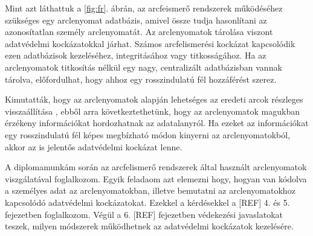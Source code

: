 
Mint azt láthattuk a \ref{fig:fr}. ábrán, az arcfeismerő rendszerek működéséhez szükséges egy arclenyomat adatbázis, amivel össze tudja hasonlítani az azonosítatlan személy arclenyomatát. Az arclenyomatok tárolása viszont adatvédelmi kockázatokkal járhat. Számos arcfelismerési kockázat kapcsolódik ezen adatbázisok kezeléséhez, integritásához vagy titkosságához. Ha az arclenyomatok titkosítás nélkül egy nagy, centralizált adatbázisban vannak tárolva, előfordulhat, hogy ahhoz egy rosszindulatú fél hozzáférést szerez.

Kimutatták, hogy az arclenyomatok alapján lehetséges az eredeti arcok részleges visszaállítása \cite{mai2018reconstruction}, ebből arra következtethetünk, hogy az arclenyomatok magukban érzékeny információkat hordozhatnak az adatalanyról. Ha ezeket az információkat egy rosszindulatú fél képes megbízható módon kinyerni az arclenyomatokból, akkor az is jelentős adatvédelmi kockázat lenne.

A diplomamunkám során az arcfelismerő rendszerek által használt arclenyomatok viszgálatával foglalkozom. Egyik feladaom azt elemezni hogy, hogyan van kódolva a személyes adat az arclenyomatokban, illetve bemutatni az arclenyomatokhoz kapcsolódó adatvédelmi kockázatokat. Ezekkel a kérdésekkel a [REF] 4. és 5. fejezetben foglalkozom. Végül a 6. [REF] fejezetben védekezési javaslatokat teszek, milyen módszerek működhetnek az adatvédelmi kockázatok kezelésére.





